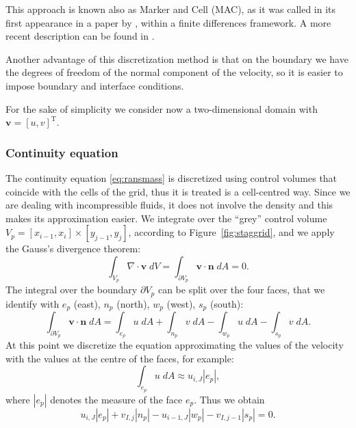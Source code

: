 This approach is known also as Marker and Cell (MAC), as it was called in its 
first appearance in a paper by \textcite{stagg:orig}, within a finite 
differences framework. A more recent description can be found in 
\cite{main:vermal}.

Another advantage of this discretization method is that on the boundary we have 
the degrees of freedom of the normal component of the velocity, so it is easier 
to impose boundary and interface conditions.

For the sake of simplicity we consider now a two-dimensional domain with 
$\mathbf{v} = [u, v]^{\mathrm{T}}$.
%
\subsubsection{Continuity equation}
The continuity equation \eqref{eq:ransmass} is discretized using control 
volumes that coincide with the cells of the grid, thus it is treated is a 
cell-centred way. Since we are dealing with incompressible fluids, it does not 
involve the density and this makes its approximation easier.
We integrate over the ``grey'' control volume $V_p = [x_{i-1},x_i] \times 
[y_{j-1},y_j]$, according to Figure~\ref{fig:staggrid}, and we apply the 
Gauss's divergence theorem:
\begin{equation}
\int_{V_p} \nabla \cdot \mathbf{v} \; dV = \int_{\partial V_p} \mathbf{v} \cdot 
\mathbf{n} \; dA = 0. 
\end{equation}
The integral over the boundary $\partial V_p$ can be split over the four faces, 
that we identify with $e_p$ (east), $n_p$ (north), $w_p$ (west), $s_p$ (south):
\begin{equation}
\int_{\partial V_p} \mathbf{v} \cdot \mathbf{n} \; dA = \int_{e_p} u \; dA
+ \int_{n_p} v \; dA - \int_{w_p} u \; dA - \int_{s_p} v \; dA.
\end{equation}
At this point we discretize the equation approximating the values of the 
velocity with the values at the centre of the faces, for example:
\begin{equation}
\int_{e_p} u \; dA \approx u_{i,J} |e_p|,
\end{equation}
where $|e_p|$ denotes the measure of the face $e_p$. Thus we obtain
\begin{equation}
	u_{i,J} |e_p| + v_{I,j}|n_p| - u_{i-1,J}|w_p| - v_{I,j-1}|s_p| = 0.
\end{equation}
%
